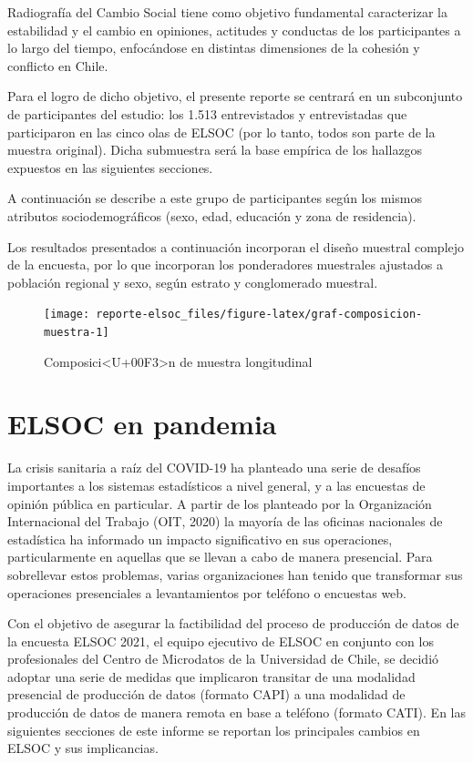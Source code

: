 \documentclass[
  12pt,
]{book}
\begin{document}
Radiografía del Cambio Social tiene como objetivo fundamental caracterizar la estabilidad y el cambio en opiniones, actitudes y conductas de los participantes a lo largo del tiempo, enfocándose en distintas dimensiones de la cohesión y conflicto en Chile.

Para el logro de dicho objetivo, el presente reporte se centrará en un subconjunto de participantes del estudio: los 1.513 entrevistados y entrevistadas que participaron en las cinco olas de ELSOC (por lo tanto, todos son parte de la muestra original). Dicha submuestra será la base empírica de los hallazgos expuestos en las siguientes secciones.

A continuación se describe a este grupo de participantes según los mismos atributos sociodemográficos (sexo, edad, educación y zona de residencia).

Los resultados presentados a continuación incorporan el diseño muestral complejo de la encuesta, por lo que incorporan los ponderadores muestrales ajustados a población regional y sexo, según estrato y conglomerado muestral.

\begin{figure}

{\centering \texttt{[image: reporte-elsoc\_files/figure-latex/graf-composicion-muestra-1]} 

}

\caption{Composici<U+00F3>n de muestra longitudinal}\label{fig:graf-composicion-muestra}
\end{figure}

\hypertarget{elsoc-en-pandemia}{%
\section{ELSOC en pandemia}\label{elsoc-en-pandemia}}

La crisis sanitaria a raíz del COVID-19 ha planteado una serie de desafíos importantes a los sistemas estadísticos a nivel general, y a las encuestas de opinión pública en particular. A partir de los planteado por la Organización Internacional del Trabajo (OIT, 2020) la mayoría de las oficinas nacionales de estadística ha informado un impacto significativo en sus operaciones, particularmente en aquellas que se llevan a cabo de manera presencial. Para sobrellevar estos problemas, varias organizaciones han tenido que transformar sus operaciones presenciales a levantamientos por teléfono o encuestas web.

Con el objetivo de asegurar la factibilidad del proceso de producción de datos de la encuesta ELSOC 2021, el equipo ejecutivo de ELSOC en conjunto con los profesionales del Centro de Microdatos de la Universidad de Chile, se decidió adoptar una serie de medidas que implicaron transitar de una modalidad presencial de producción de datos (formato CAPI) a una modalidad de producción de datos de manera remota en base a teléfono (formato CATI). En las siguientes secciones de este informe se reportan los principales cambios en ELSOC y sus implicancias.
\end{document}
